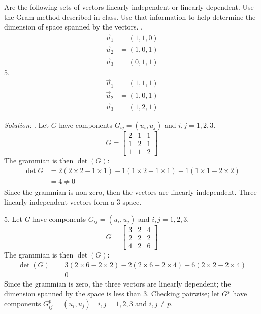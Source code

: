 \documentclass[11pt]{homework}
\begin{document}
\newpage
\question
Are the following sets of vectors linearly independent or linearly dependent.
Use the Gram method described in class.
Use that information to help determine the dimension of space spanned by the vectors.
.
\begin{align*}
  \vec u_1 &= ( 1, 1, 0) \\
  \vec u_2 &= ( 1, 0, 1) \\
  \vec u_3 &= ( 0, 1, 1)
\end{align*}
5.
\begin{align*}
  \vec u_1 &= ( 1, 1, 1) \\
  \vec u_2 &= ( 1, 0, 1) \\
  \vec u_3 &= ( 1, 2, 1)
\end{align*}

\emph{Solution:}
. Let $G$ have components $G_{ij} = (u_i,u_j)$ and $i,j = 1,2,3$.
\begin{equation*}
  G =
  \begin{bmatrix}
  2 & 1 & 1 \\
  1 & 2 & 1 \\
  1 & 1 & 2 
  \end{bmatrix}
\end{equation*}
The grammian is then $\det(G)$:
\begin{align*}
  \det{G} &= 
    2( 2 \times 2 - 1 \times 1) 
   -1( 1 \times 2 - 1 \times 1)
   +1( 1 \times 1 - 2 \times 2) \\
 &= 4 \neq 0
\end{align*}
Since the grammian is non-zero, then the vectors are linearly independent.
Three linearly independent vectors form a 3-space.

5. Let $G$ have components $G_{ij} = (u_i,u_j)$ and $i,j = 1,2,3$.
\begin{equation*}
  G =
  \begin{bmatrix}
  3 & 2 & 4 \\
  2 & 2 & 2 \\
  4 & 2 & 6
  \end{bmatrix}
\end{equation*}
The grammian is then $\det(G)$:
\begin{align*}
  \det (G) &= 
    3( 2 \times 6 - 2 \times 2)
   -2( 2 \times 6 - 2 \times 4)
   +6( 2 \times 2 - 2 \times 4) \\
  &= 0
\end{align*}
Since the grammian is zero, the three vectors are linearly dependent;
the dimension spanned by the space is less than 3.
Checking pairwise; let $G^{p}$ have components 
$G^{p}_{ij} = (u_i, u_j) \quad i,j=1,2,3$ and $i,j\neq p$.
\end{document}
